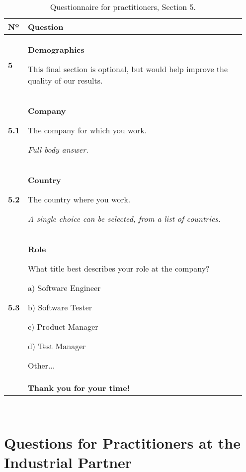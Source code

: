 \begin{table}[]
\centering
\small
{}
\begin{tabular}{p{0.05\linewidth}p{0.9\linewidth}}
\toprule
\textbf{Nº} & \textbf{Question} \\
\midrule
\textbf{5} & \textbf{Demographics}

This final section is optional, but would help improve the quality of our results.\\

\textbf{5.1} & \textbf{Company}

The company for which you work.

\textit{Full body answer.} \\

\textbf{5.2} & \textbf{Country}

The country where you work.

\textit{A single choice can be selected, from a list of countries.} \\

\textbf{5.3} & \textbf{Role}

What title best describes your role at the company?

a) Software Engineer

b) Software Tester

c) Product Manager

d) Test Manager

Other... \\

& \textbf{Thank you for your time!} \\

\bottomrule
\end{tabular}\\
\caption{Questionnaire for practitioners, Section 5.}
\label{table:interview_questions}
\end{table}

\clearpage

\section{Questions for Practitioners at the Industrial Partner}
\label{sec:app_ind_questions}

